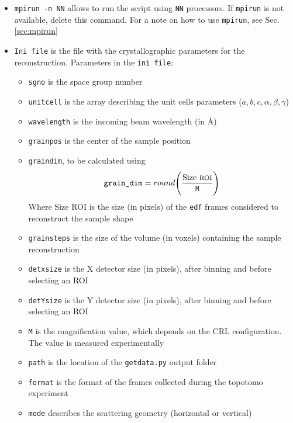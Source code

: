 \documentclass[11pt]{scrartcl}
\begin{document}
\begin{itemize}
    \item {\texttt{mpirun -n NN}} allows to run the script using {\texttt{NN}} processors. If {\texttt{mpirun}} is not available, delete this command. For a note on how to use {\texttt{mpirun}}, see Sec. \ref{sec:mpirun} 
    \item {\texttt{Ini file}} is the file with the crystallographic parameters for the reconstruction. Parameters in the {\texttt{ini file}}:
    \begin{itemize}
        \item {\texttt{sg\textunderscore no}} is the space group number
        \item {\texttt{unit\textunderscore cell}} is the array describing the unit cells parameters ($a,b,c,\alpha, \beta, \gamma$)
        \item {\texttt{wavelength}} is the incoming beam wavelength (in \AA)
        \item {\texttt{grain\textunderscore pos}} is the center of the sample position
        \item {\texttt{grain\textunderscore dim}}, to be calculated using 
        \begin{equation}
            {\texttt{grain\textunderscore dim}} = round \Bigg( \frac{{\text{Size {\footnotesize{ROI}}}}}{\texttt{M}} \Bigg)
        \end{equation}
        Where Size {\footnotesize{ROI}} is the size (in pixels) of the {\texttt{edf}} frames considered to reconstruct the sample shape
        \item {\texttt{grain\textunderscore steps}} is the size of the volume (in voxels) containing the sample reconstruction 
        \item {\texttt{detx\textunderscore size}} is the {\footnotesize{X}} detector size (in pixels), after binning and before selecting an {\footnotesize{ROI}}
        \item {\texttt{detY\textunderscore size}} is the {\footnotesize{Y}} detector size (in pixels), after binning and before selecting an {\footnotesize{ROI}}
        \item {\texttt{M}} is the magnification value, which depends on the {\footnotesize{CRL}} configuration. The value is measured experimentally
        \item {\texttt{path}} is the location of the {\texttt{getdata.py}} output folder
        \item {\texttt{format}} is the format of the frames collected during the topotomo experiment
        \item {\texttt{mode}} describes the scattering geometry (horizontal or vertical)
    \end{itemize}


\end{itemize}
\end{document}

